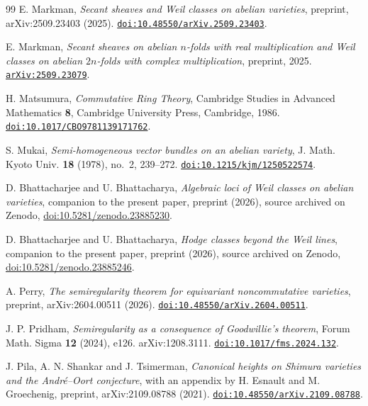 \begin{thebibliography}{99}
E. Markman,
\emph{Secant sheaves and Weil classes on abelian varieties},
preprint, arXiv:2509.23403 (2025).
\href{https://doi.org/10.48550/arXiv.2509.23403}{\texttt{doi:10.48550/arXiv.2509.23403}}.

E. Markman,
\emph{Secant sheaves on abelian $n$-folds with real multiplication and Weil
classes on abelian $2n$-folds with complex multiplication},
preprint, 2025.
\href{https://arxiv.org/abs/2509.23079}{\texttt{arXiv:2509.23079}}.

H. Matsumura,
\emph{Commutative Ring Theory},
Cambridge Studies in Advanced Mathematics \textbf{8},
Cambridge University Press, Cambridge, 1986.
\href{https://doi.org/10.1017/CBO9781139171762}{\texttt{doi:10.1017/CBO9781139171762}}.

S. Mukai,
\emph{Semi-homogeneous vector bundles on an abelian variety},
J. Math. Kyoto Univ. \textbf{18} (1978), no.~2, 239--272.
\href{https://doi.org/10.1215/kjm/1250522574}{\texttt{doi:10.1215/kjm/1250522574}}.

D. Bhattacharjee and U. Bhattacharya,
\emph{Algebraic loci of Weil classes on abelian varieties},
companion to the present paper, preprint (2026), source archived on Zenodo,
\href{https://doi.org/10.5281/zenodo.23885230}{doi:10.5281/zenodo.23885230}.

D. Bhattacharjee and U. Bhattacharya,
\emph{Hodge classes beyond the Weil lines},
companion to the present paper, preprint (2026), source archived on Zenodo,
\href{https://doi.org/10.5281/zenodo.23885246}{doi:10.5281/zenodo.23885246}.

A. Perry,
\emph{The semiregularity theorem for equivariant noncommutative varieties},
preprint, arXiv:2604.00511 (2026).
\href{https://doi.org/10.48550/arXiv.2604.00511}{\texttt{doi:10.48550/arXiv.2604.00511}}.

J. P. Pridham,
\emph{Semiregularity as a consequence of Goodwillie's theorem},
Forum Math. Sigma \textbf{12} (2024), e126. arXiv:1208.3111.
\href{https://doi.org/10.1017/fms.2024.132}{\texttt{doi:10.1017/fms.2024.132}}.

J. Pila, A. N. Shankar and J. Tsimerman,
\emph{Canonical heights on Shimura varieties and the Andr\'e--Oort
conjecture}, with an appendix by H. Esnault and M. Groechenig,
preprint, arXiv:2109.08788 (2021).
\href{https://doi.org/10.48550/arXiv.2109.08788}{\texttt{doi:10.48550/arXiv.2109.08788}}.


\end{thebibliography}
